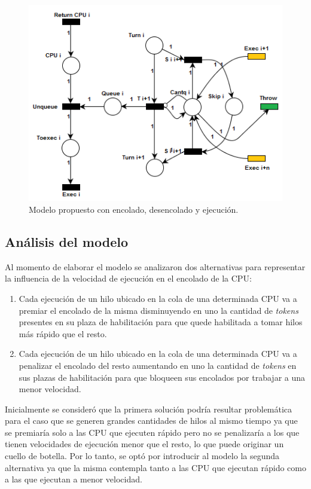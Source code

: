 \documentclass[a4paper]{book}
\begin{document}
\begin{figure} [H]
	\begin{center}
	    \includegraphics[scale=1]{./imagenes/it6modelored.png}
		\caption{Modelo propuesto con encolado, desencolado y ejecuci\'on.}
	\end{center}
\end{figure}

\subsection{An\'alisis del modelo}
Al momento de elaborar el modelo se analizaron dos alternativas para representar la influencia de la velocidad de ejecuci\'on en el encolado de la CPU:
\begin{enumerate}
\item Cada ejecuci\'on de un hilo ubicado en la cola de una determinada CPU va a premiar el encolado de la misma disminuyendo en uno la cantidad de \emph{tokens} presentes en su plaza de habilitaci\'on para que quede habilitada a tomar hilos m\'as r\'apido que el resto.
\item Cada ejecuci\'on de un hilo ubicado en la cola de una determinada CPU va a penalizar el encolado del resto aumentando en uno la cantidad de \emph{tokens} en sus plazas de habilitaci\'on para que bloqueen sus encolados por trabajar a una menor velocidad.
\end{enumerate}

Inicialmente se consider\'o que la primera soluci\'on podr\'ia resultar problem\'atica para el caso que se generen grandes cantidades de hilos al mismo tiempo ya que se premiar\'ia solo a las CPU que ejecuten r\'apido pero no se penalizar\'ia a los que tienen velocidades de ejecuci\'on menor que el resto, lo que puede originar un cuello de botella. Por lo tanto, se opt\'o por introducir al modelo la segunda alternativa ya que la misma contempla tanto a las CPU que ejecutan r\'apido como a las que ejecutan a menor velocidad.\\
\end{document}
